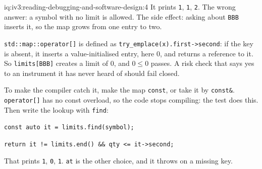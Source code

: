 \begin{solution}{iq:iv3:reading-debugging-and-software-design:4}
It prints \texttt{1}, \texttt{1}, \texttt{2}. The wrong answer: a symbol with no limit is allowed. The side effect: asking about \texttt{BBB} inserts it, so the map grows from one entry to two.

\texttt{std::map::operator[]} is defined as \texttt{try\_emplace(x).first->second}: if the key is absent, it inserts a value-initialised entry, here 0, and returns a reference to it. So \texttt{limits[\textquotedbl{}BBB\textquotedbl{}]} creates a limit of 0, and $0 \le 0$ passes. A risk check that says yes to an instrument it has never heard of should fail closed.

To make the compiler catch it, make the map \texttt{const}, or take it by \texttt{const\&}. \texttt{operator[]} has no const overload, so the code stops compiling: the test does this. Then write the lookup with \texttt{find}:

\texttt{const auto it = limits.find(symbol);}

\texttt{return it != limits.end() \&\& qty <= it->second;}

That prints \texttt{1}, \texttt{0}, \texttt{1}. \texttt{at} is the other choice, and it throws on a missing key.


\end{solution}

